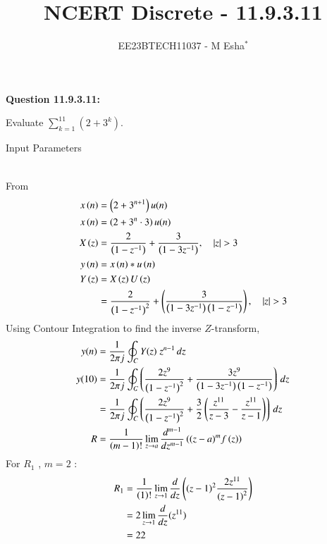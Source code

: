 \documentclass[journal,12pt,twocolumn]{IEEEtran}
\theoremstyle{remark}
\begin{document}

\vspace{3cm}

\title{NCERT Discrete - 11.9.3.11}
\author{EE23BTECH11037 - M Esha$^{*}$}

\maketitle
\newpage
\bigskip

\renewcommand{\thefigure}{\theenumi}
\renewcommand{\thetable}{\theenumi}

\vspace{3cm}
\textbf{Question 11.9.3.11:}

Evaluate $\sum_{k=1}^{11} (2 + 3^k)$.

\solution
\begin{table}[h!]
  \centering
  
  \caption{Input Parameters}
    \label{tab:table1}
\end{table}\\
From 
\begin{align}
x\brak{n} &= \brak{2+3^{n+1}}u(n)\\
x\brak{n} &= \brak{2+3^{n}\cdot{3}}u(n)\\
X\brak{z} &= \frac{2}{\brak{1-z^{-1}}}+\frac{3}{\brak{1-3z^{-1}}} , \quad |z|>3\\
y\brak{n} &= x\brak{n}*u\brak{n} \\
Y\brak{z} &= X\brak{z}U\brak{z}\\
&=\frac{2}{\brak{1-z^{-1}}^{2}}+\brak{\frac{3}{\brak{1-3z^{-1}}\brak{1-z^{-1}}}} ,\quad |z|>3
\end{align}
 Using Contour Integration to find the inverse $Z$-transform,
\begin{align}
y(n)&=\frac{1}{2\pi j}\oint_{C}Y(z) \;z^{n-1} \,dz  \\
y(10)&=\frac{1}{2\pi j}\oint_{C}\left(\frac{2z^{9}}{\left(1-z^{-1}\right)^{2}}+\frac{3z^{9}}{\left(1-3z^{-1}\right)\left(1-z^{-1}\right)}\right) \, dz\\
&=\frac{1}{2\pi j}\oint_{C}\left(\frac{2z^{9}}{\left(1-z^{-1}\right)^{2}}+\frac{3}{2}\left(\frac{z^{11}}{z-3}-\frac{z^{11}}{z-1}\right)\right) \,dz\\
R &=\frac{1}{\left(m-1\right)!}\lim\limits_{z\to a}\frac{d^{m-1}}{dz^{m-1}}\left({(z-a)^{m}}f\left(z\right)\right)
\end{align}
For $R_1$ , $m=2$ :
\begin{align}
R_1 &=\frac{1}{\left(1\right)!}\lim\limits_{z\to 1}\frac{d}{dz}\left({\left(z-1\right)^{2}}\frac{2z^{11}}{{\left(z-1\right)^2}}\right)  \\
&=2\lim\limits_{z\to 1}\frac{d}{dz}(z^{11})   \\
&=22
\end{align}
\end{document}
